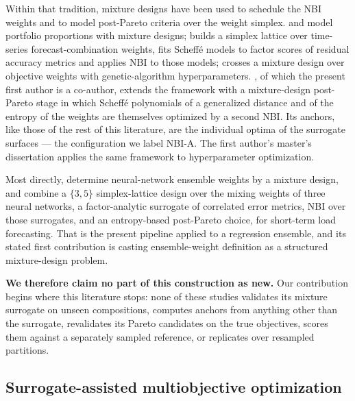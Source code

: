 Within that tradition, mixture designs have been used to schedule the NBI weights and to model post-Pareto criteria
over the weight simplex. \citet{mendes2016portfolio_mde} and \citet{leal2022portfolio_doptimal_mde} model portfolio
proportions with mixture designs; \citet{bacci2019nbi_mixture} builds a simplex lattice over time-series
forecast-combination weights, fits Scheffé models to factor scores of residual accuracy metrics and applies NBI to
those models; \citet{paula2019gatuning} crosses a mixture design over objective weights with genetic-algorithm
hyperparameters. \citet{pereira2025hybrid}, of which the present first author is a co-author, extends the framework
with a mixture-design post-Pareto stage in which Scheffé polynomials of a generalized distance and of the entropy of
the weights are themselves optimized by a second NBI. Its anchors, like those of the rest of this literature, are the
individual optima of the surrogate surfaces --- the configuration we label NBI-A. The first author's master's
dissertation \citep{ribeiro2026dissertation} applies the same framework to hyperparameter optimization.

Most directly, \citet{moreira2021ann_ensemble_mde} determine neural-network ensemble weights by a mixture design, and
\citet{rocha2025ensemblestlf} combine a $\{3,5\}$ simplex-lattice design over the mixing weights of three neural
networks, a factor-analytic surrogate of correlated error metrics, NBI over those surrogates, and an entropy-based
post-Pareto choice, for short-term load forecasting. That is the present pipeline applied to a regression ensemble, and
its stated first contribution is casting ensemble-weight definition as a structured mixture-design problem.

\textbf{We therefore claim no part of this construction as new.} Our contribution begins where this literature stops:
none of these studies validates its mixture surrogate on unseen compositions, computes anchors from anything other than
the surrogate, revalidates its Pareto candidates on the true objectives, scores them against a separately sampled
reference, or replicates over resampled partitions.

\subsection{Surrogate-assisted multiobjective optimization}
\label{sec:rel:surrogate}

